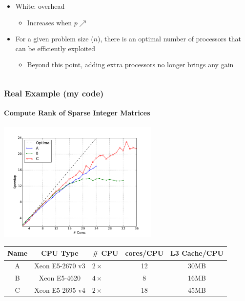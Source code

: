 \documentclass[xcolor={x11names,svgnames,psnames}]{beamer}
\begin{document}
\begin{frame}
\begin{columns}
\begin{column}{0.63\textwidth}
\begin{itemize}
        \medskip
        
      \item White: overhead
        \begin{itemize}
        \item Increases when $p \nearrow$
        \end{itemize}

        \medskip
        
      \item For a given problem size ($n$), there is an optimal number of processors that can be efficiently exploited
        \begin{itemize}
        \item Beyond this point, adding extra processors no longer brings any gain
        \end{itemize}
      \end{itemize}
    \end{column}
  \end{columns}  
\end{frame}


\begin{frame}
\frametitle{Real Example (my code)}
\framesubtitle{Compute Rank of Sparse Integer Matrices}

\centering
\includegraphics[height=6cm]{d19.pdf}

\medskip

\small
  \begin{tabular}{|c|c|l|c|c|}
\hline
Name & CPU Type        & \# CPU     & cores/CPU & L3 Cache/CPU\\
\hline\hline
A    & Xeon E5-2670 v3 & $2 \times$ & 12        & 30MB\\
\hline
B    & Xeon E5-4620    & $4 \times$ & 8         & 16MB\\
\hline
C    & Xeon E5-2695 v4 & $2 \times$ & 18        & 45MB\\
\hline
\end{tabular}



\end{frame}
\end{document}
